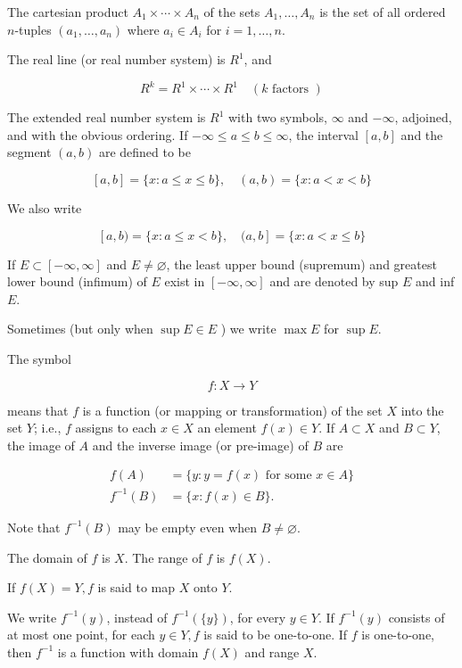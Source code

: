 \documentclass[10pt]{article}
\begin{document}
The cartesian product $A_{1} \times \cdots \times A_{n}$ of the sets $A_{1}, \ldots, A_{n}$ is the set of all ordered $n$-tuples $\left(a_{1}, \ldots, a_{n}\right)$ where $a_{i} \in A_{i}$ for $i=1, \ldots, n$.

The real line (or real number system) is $R^{1}$, and

$$
R^{k}=R^{1} \times \cdots \times R^{1} \quad(k \text { factors })
$$

The extended real number system is $R^{1}$ with two symbols, $\infty$ and $-\infty$, adjoined, and with the obvious ordering. If $-\infty \leq a \leq b \leq \infty$, the interval $[a, b]$ and the segment $(a, b)$ are defined to be

$$
[a, b]=\{x: a \leq x \leq b\}, \quad(a, b)=\{x: a<x<b\}
$$

We also write

$$
[a, b)=\{x: a \leq x<b\}, \quad(a, b]=\{x: a<x \leq b\}
$$

If $E \subset[-\infty, \infty]$ and $E \neq \varnothing$, the least upper bound (supremum) and greatest lower bound (infimum) of $E$ exist in $[-\infty, \infty]$ and are denoted by sup $E$ and inf $E$.

Sometimes (but only when $\sup E \in E$ ) we write $\max E$ for $\sup E$.

The symbol

$$
f: X \rightarrow Y
$$

means that $f$ is a function (or mapping or transformation) of the set $X$ into the set $Y$; i.e., $f$ assigns to each $x \in X$ an element $f(x) \in Y$. If $A \subset X$ and $B \subset Y$, the image of $A$ and the inverse image (or pre-image) of $B$ are

$$
\begin{aligned}
f(A) & =\{y: y=f(x) \text { for some } x \in A\} \\
f^{-1}(B) & =\{x: f(x) \in B\} .
\end{aligned}
$$

Note that $f^{-1}(B)$ may be empty even when $B \neq \varnothing$.

The domain of $f$ is $X$. The range of $f$ is $f(X)$.

If $f(X)=Y, f$ is said to map $X$ onto $Y$.

We write $f^{-1}(y)$, instead of $f^{-1}(\{y\})$, for every $y \in Y$. If $f^{-1}(y)$ consists of at most one point, for each $y \in Y, f$ is said to be one-to-one. If $f$ is one-to-one, then $f^{-1}$ is a function with domain $f(X)$ and range $X$.
\end{document}
